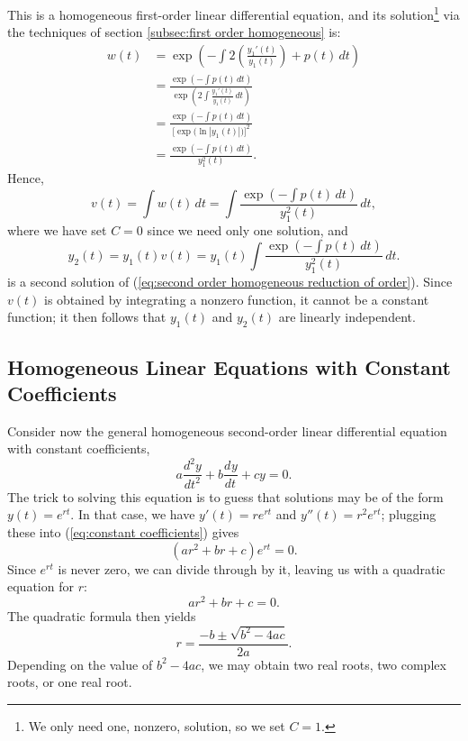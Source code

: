 \documentclass{myart}
\newcommand{\eq}[1]{(\ref{eq:#1})}
\newcommand{\deriv}[3][]{\frac{d^{#1}#2}{d#3^{#1}}}
\begin{document}
This is a homogeneous first-order linear differential equation, and its solution\footnote{We only need one, nonzero, solution, so we set $C = 1$.} via the techniques of section \ref{subsec:first order homogeneous} is:
\begin{align*}
w(t) &= \exp\left(-\int 2\left(\frac{y_1'(t)}{y_1(t)}\right) + p(t) \,dt\right) \\
&= \frac{\exp\left(-\int p(t) \,dt\right)}{\exp\left(2 \int \frac{y_1'(t)}{y_1(t)} \,dt\right)} \\
&= \frac{\exp\left(-\int p(t) \,dt\right)}{\Big[\exp\big(\ln|y_1(t)|\big)\Big]^2} \\
&= \frac{\exp\left(-\int p(t) \,dt\right)}{y_1^2(t)}.
\end{align*}
Hence,
\begin{equation*}
v(t) = \int w(t) \,dt = \int \frac{\exp\left(-\int p(t) \,dt\right)}{y_1^2(t)} \,dt,
\end{equation*}
where we have set $C = 0$ since we need only one solution, and
\begin{equation*}
y_2(t) = y_1(t)v(t) = y_1(t) \int \frac{\exp\left(-\int p(t) \,dt\right)}{y_1^2(t)} \,dt.
\end{equation*}
is a second solution of \eq{second order homogeneous reduction of order}. Since $v(t)$ is obtained by integrating a nonzero function, it cannot be a constant function; it then follows that $y_1(t)$ and $y_2(t)$ are linearly independent.

\subsection{Homogeneous Linear Equations with Constant Coefficients} \label{subsec:constant coefficients}

Consider now the general homogeneous second-order linear differential equation with constant coefficients,
\begin{equation} \label{eq:constant coefficients}
a \deriv[2]{y}{t} + b \deriv{y}{t} + cy = 0.
\end{equation}
The trick to solving this equation is to guess that solutions may be of the form $y(t) = e^{rt}$. In that case, we have $y'(t) = re^{rt}$ and $y''(t) = r^2e^{rt}$; plugging these into \eq{constant coefficients} gives
\begin{equation*}
(ar^2 + br + c)e^{rt} = 0.
\end{equation*}
Since $e^{rt}$ is never zero, we can divide through by it, leaving us with a quadratic equation for $r$:
\begin{equation*}
ar^2 + br + c = 0.
\end{equation*}
The quadratic formula then yields
\begin{equation*}
r = \frac{-b \pm \sqrt{b^2 - 4ac}}{2a}.
\end{equation*}
Depending on the value of $b^2 - 4ac$, we may obtain two real roots, two complex roots, or one real root.
\end{document}
